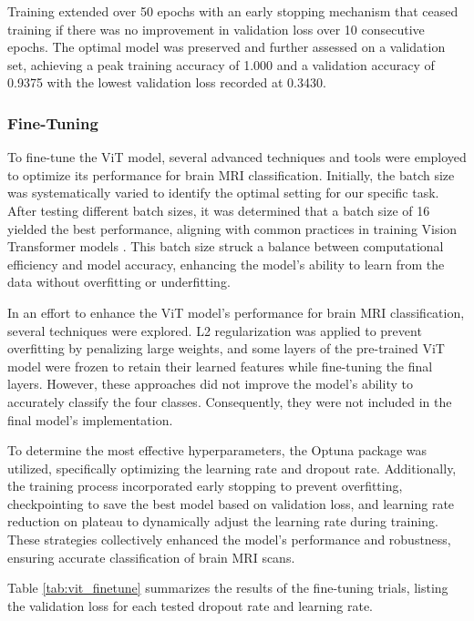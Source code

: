 Training extended over 50 epochs with an early stopping mechanism that ceased training if there was no improvement in validation loss over 10 consecutive epochs. The optimal model was preserved and further assessed on a validation set, achieving a peak training accuracy of 1.000 and a validation accuracy of 0.9375 with the lowest validation loss recorded at 0.3430.


\subsubsection{Fine-Tuning}

To fine-tune the ViT model, several advanced techniques and tools were employed to optimize its performance for brain MRI classification. Initially, the batch size was systematically varied to identify the optimal setting for our specific task. After testing different batch sizes, it was determined that a batch size of 16 yielded the best performance, aligning with common practices in training Vision Transformer models \cite{Al-Hadhrami2023An}. This batch size struck a balance between computational efficiency and model accuracy, enhancing the model's ability to learn from the data without overfitting or underfitting.


In an effort to enhance the ViT model's performance for brain MRI classification, several techniques were explored. L2 regularization was applied to prevent overfitting by penalizing large weights, and some layers of the pre-trained ViT model were frozen to retain their learned features while fine-tuning the final layers. However, these approaches did not improve the model's ability to accurately classify the four classes. Consequently, they were not included in the final model's implementation.

To determine the most effective hyperparameters, the Optuna package was utilized, specifically optimizing the learning rate and dropout rate. Additionally, the training process incorporated early stopping to prevent overfitting, checkpointing to save the best model based on validation loss, and learning rate reduction on plateau to dynamically adjust the learning rate during training. These strategies collectively enhanced the model's performance and robustness, ensuring accurate classification of brain MRI scans.

Table \ref{tab:vit_finetune} summarizes the results of the fine-tuning trials, listing the validation loss for each tested dropout rate and learning rate.

